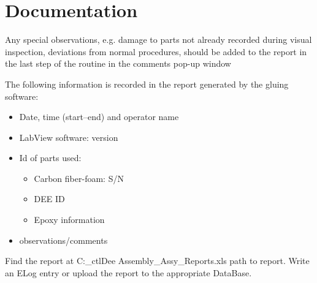 \documentclass[12pt]{cornelltfpxsop}
\begin{document}
\section{Documentation}

Any special observations, e.g. damage to parts not already recorded during visual inspection, deviations from normal procedures, should be added to the report in the last step of the routine in the comments pop-up window 

The following information is recorded in the report generated by the gluing software:
\begin{itemize}
    \item Date, time (start--end) and operator name
    \item LabView software: version
    \item Id of parts used:
	\begin{itemize}
	    \item Carbon fiber-foam: S/N
	    \item DEE ID
	    \item Epoxy information
	\end{itemize}
    \item observations/comments
\end{itemize}

Find the report at C:\Users{}_ctl\Documents\Timofei\Final Dee Assembly\Dee_Assy_Reports\Report.xls path to report. Write an ELog entry or upload the report to the appropriate DataBase.  
\end{document}
